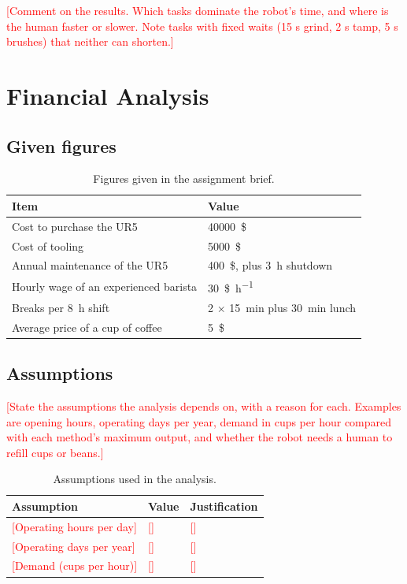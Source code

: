 \documentclass[11pt,a4paper]{article}
\newcommand{\todo}[1]{\textcolor{red}{[#1]}}
\begin{document}
\todo{Comment on the results. Which tasks dominate the robot's time, and where
is the human faster or slower. Note tasks with fixed waits (15 s grind, 2 s
tamp, 5 s brushes) that neither can shorten.}

\section{Financial Analysis}

\subsection{Given figures}

\begin{table}[h]
\centering
\caption{Figures given in the assignment brief.}
\begin{tabular}{ll}
\toprule
Item & Value \\
\midrule
Cost to purchase the UR5 & \SI{40000}{\$} \\
Cost of tooling & \SI{5000}{\$} \\
Annual maintenance of the UR5 & \SI{400}{\$}, plus \SI{3}{\hour} shutdown \\
Hourly wage of an experienced barista & \SI{30}{\$\per\hour} \\
Breaks per \SI{8}{\hour} shift & 2 $\times$ \SI{15}{\minute} plus \SI{30}{\minute} lunch \\
Average price of a cup of coffee & \SI{5}{\$} \\
\bottomrule
\end{tabular}
\end{table}

\subsection{Assumptions}
\todo{State the assumptions the analysis depends on, with a reason for each.
Examples are opening hours, operating days per year, demand in cups per hour
compared with each method's maximum output, and whether the robot needs a human
to refill cups or beans.}

\begin{table}[h]
\centering
\caption{Assumptions used in the analysis.}
\begin{tabular}{lll}
\toprule
Assumption & Value & Justification \\
\midrule
\todo{Operating hours per day} & \todo{} & \todo{} \\
\todo{Operating days per year} & \todo{} & \todo{} \\
\todo{Demand (cups per hour)} & \todo{} & \todo{} \\
\bottomrule
\end{tabular}
\end{table}
\end{document}
